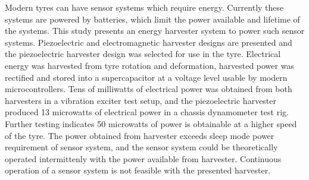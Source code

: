 \documentclass[english,12pt,a4paper,pdftex,elec,utf8]{aaltothesis}
\begin{document}
\makecoverpage



\begin{abstractpage}[english]
Modern tyres can have sensor systems which require energy. Currently these systems are powered by batteries, which limit the power available and lifetime of the systems. This study presents an energy harvester system to power such sensor systems. Piezoelectric and electromagnetic harvester designs are 
presented and the piezoelectric harvester design was selected for use in the tyre. Electrical energy was harvested from tyre rotation and deformation, harvested power was rectified and stored into a supercapacitor at a voltage level usable by modern microcontrollers. Tens of milliwatts of electrical power was obtained from both harvesters in a vibration exciter test setup, and the piezoelectric harvester produced 13 microwatts of electrical power in a chassis dynamometer test rig. Further testing indicates 50 microwatts of power is obtainable at a higher speed of the tyre. The power obtained from harvester exceeds sleep mode power requirement of sensor system, and the sensor system could be theoretically operated intermittenly with the power available from harvester. Continuous operation of a sensor system is not feasible with the presented harvester.
\end{abstractpage}
\end{document}
